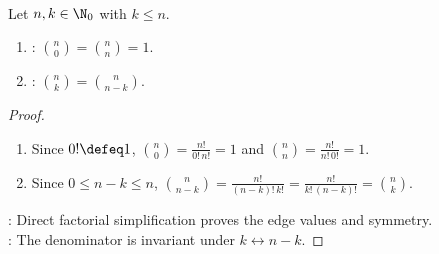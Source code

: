 \begin{proposition} \label{prop:binomial-coefficient-edge-and-symmetry} \\
Let $n,k\in\N_0$ with $k\leq n$.
\begin{enumerate}[label=(\roman*)]
\setlength{\itemsep}{0pt}
\item {}: $\binom{n}{0}=\binom{n}{n}=1$.
\item {}: $\binom{n}{k}=\binom{n}{n-k}$.
\end{enumerate}
\begin{proof}
\begin{enumerate}[label=(\roman*)]
\setlength{\itemsep}{0pt}
\item Since $0!\defeq1$, $\binom{n}{0}=\frac{n!}{0!\,n!}=1$ and $\binom{n}{n}=\frac{n!}{n!\,0!}=1$.
\item Since $0\leq n-k\leq n$, $\binom{n}{n-k}=\frac{n!}{(n-k)!\,k!}=\frac{n!}{k!\,(n-k)!}=\binom{n}{k}$.
\end{enumerate}
: Direct factorial simplification proves the edge values and symmetry.\\
: The denominator is invariant under $k\leftrightarrow n-k$.
\end{proof}
\end{proposition}

